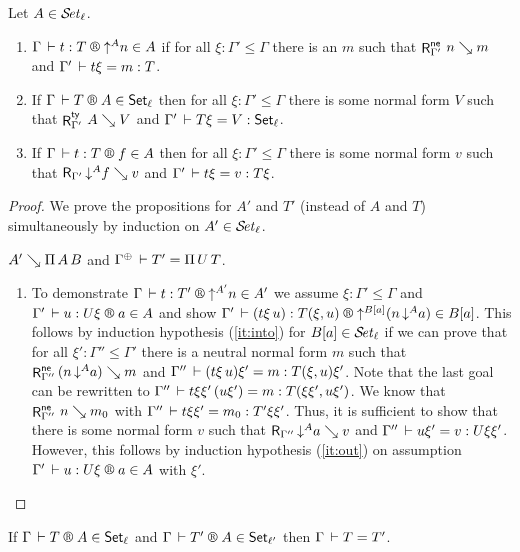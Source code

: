\documentclass[acmlarge,review,anonymous]{acmart}\settopmatter{printfolios=true}
\begin{document}
\begin{theorem}
  \label{thm:into}
  \bla
  Let $A \in \SET[\ell]$.
  \begin{enumerate}

  \item \label{it:into}
     $\LR \Gamma t T {\up A n} A$ if for all $\xi : \Gamma' \leq \Gamma$ there is an $m$ such that
     $\RNe{\Gamma'}n m$ and\/ $\Gamma' \der t\xi = m : T$.

  \item \label{it:outty}
     If\/ $\LRT{\Gamma} T A \ell$ then for all $\xi : \Gamma' \leq \Gamma$
     there is some normal form $V$ such that
     $\Rty{\Gamma'} A V$ and $\Gamma' \der T\xi = V : \Set[\ell]$.

  \item \label{it:out}
    If\/ $\LR \Gamma t T f A$ then for all $\xi : \Gamma' \leq \Gamma$
    there is some normal form $v$ such that
    $\R{\Gamma'} {\down A f} v$ and $\Gamma' \der t\xi = v : T\xi$.

  \end{enumerate}
\end{theorem}

\begin{proof}
We prove the propositions for $A'$ and $T'$ (instead of $A$ and $T$)
simultaneously by induction on $A' \in \SET[\ell]$.

\begin{caselist}

\nextcase $A' \evalsto \piT A B$ and $\resurrect\Gamma \der T' = \piT U T$.
\begin{enumerate}
\item To demonstrate $\LR \Gamma t {T'} {\up {A'} n} {A'}$ we assume
$\xi : \Gamma' \leq \Gamma$ and $\LR{\Gamma'}{u}{U\xi} a A$ and show
$\LR{\Gamma'} {(t\xi\,u)} {T(\xi,u)} {\up{B[a]}(n\,\down A a)} {B[a]}$.
This follows by induction hypothesis (\ref{it:into}) for $B[a] \in \SET[\ell]$ if
we can prove that for all $\xi' : \Gamma'' \leq \Gamma'$ there is a neutral normal form $m$
such that $\RNe{\Gamma''} {(n\,\down A a)} m$ and $\Gamma'' \der (t\xi\,u)\xi' = m : T(\xi,u)\xi'$.
Note that the last goal can be rewritten to $\Gamma'' \der t\xi\xi'\,(u\xi') = m : T(\xi\xi',u\xi')$.
We know that $\RNe{\Gamma''} n {m_0}$ with $\Gamma'' \der t\xi\xi' = m_0 : T'\xi\xi'$.
Thus, it is sufficient to show that there is some normal form $v$ such that
$\R{\Gamma''} {\down A a} v$ and $\Gamma'' \der u\xi' = v : U\xi\xi'$.
However, this follows by induction hypothesis (\ref{it:out}) on
assumption $\LR{\Gamma'}{u}{U\xi} a A$ with $\xi'$.
\end{enumerate}
\end{caselist}
\end{proof}
\begin{corollary}
\bla
If $\LRT \Gamma T A \ell$ and $\LRT \Gamma {T'} A {\ell'}$ then $\Gamma \der T = T'$.
\end{corollary}
\end{document}
